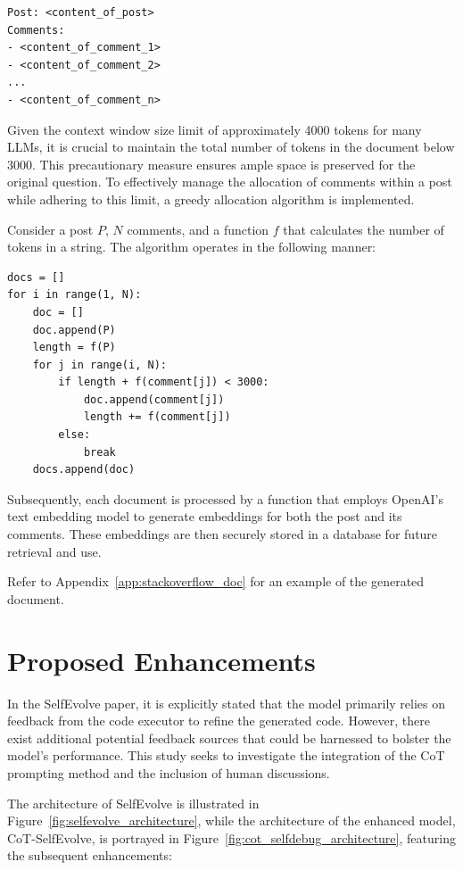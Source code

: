 \documentclass[a4paper,oneside]{book}
\begin{document}
\begin{lstlisting}
Post: <content_of_post>
Comments:
- <content_of_comment_1>
- <content_of_comment_2>
...
- <content_of_comment_n>
\end{lstlisting}

Given the context window size limit of approximately 4000 tokens for many LLMs, it is crucial to maintain the total number of tokens in the document below 3000. This precautionary measure ensures ample space is preserved for the original question. To effectively manage the allocation of comments within a post while adhering to this limit, a greedy allocation algorithm is implemented.

Consider a post $P$, $N$ comments, and a function $f$ that calculates the number of tokens in a string. The algorithm operates in the following manner:

\begin{lstlisting}
docs = []
for i in range(1, N):
    doc = []
    doc.append(P)
    length = f(P)
    for j in range(i, N):
        if length + f(comment[j]) < 3000:
            doc.append(comment[j])
            length += f(comment[j])
        else:
            break
    docs.append(doc)
\end{lstlisting}

Subsequently, each document is processed by a function that employs OpenAI's text embedding model to generate embeddings for both the post and its comments. These embeddings are then securely stored in a database for future retrieval and use.

Refer to Appendix~\ref{app:stackoverflow_doc} for an example of the generated document.

\section{Proposed Enhancements}
In the SelfEvolve paper, it is explicitly stated that the model primarily relies on feedback from the code executor to refine the generated code. However, there exist additional potential feedback sources that could be harnessed to bolster the model's performance. This study seeks to investigate the integration of the CoT prompting method and the inclusion of human discussions.

The architecture of SelfEvolve is illustrated in Figure~\ref{fig:selfevolve_architecture}, while the architecture of the enhanced model, CoT-SelfEvolve, is portrayed in Figure~\ref{fig:cot_selfdebug_architecture}, featuring the subsequent enhancements:
\end{document}

